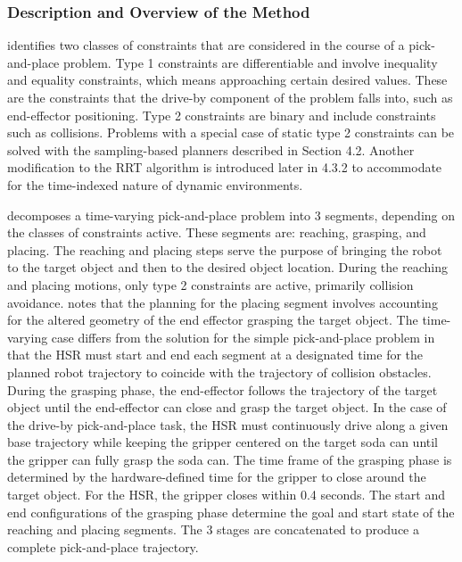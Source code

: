 \documentclass[11pt]{article}
\begin{document}
        \subsubsection{Description and Overview of the Method}
            \cite{yang_planning_2018} identifies two classes of constraints that are considered in the course of a pick-and-place problem. Type 1 constraints are differentiable and involve inequality and equality constraints, which means approaching certain desired values. These are the constraints that the drive-by component of the problem falls into, such as end-effector positioning. Type 2 constraints are binary and include constraints such as collisions. Problems with a special case of static type 2 constraints can be solved with the sampling-based planners described in Section 4.2. Another modification to the RRT algorithm is introduced later in 4.3.2 to accommodate for the time-indexed nature of dynamic environments.

            \par \cite{yang_planning_2018} decomposes a time-varying pick-and-place problem into 3 segments, depending on the classes of constraints active. These segments are: reaching, grasping, and placing. The reaching and placing steps serve the purpose of bringing the robot to the target object and then to the desired object location. During the reaching and placing motions, only type 2 constraints are active, primarily collision avoidance. \cite{yang_planning_2018} notes that the planning for the placing segment involves accounting for the altered geometry of the end effector grasping the target object. The time-varying case differs from the solution for the simple pick-and-place problem in that the HSR must start and end each segment at a designated time for the planned robot trajectory to coincide with the trajectory of collision obstacles. During the grasping phase, the end-effector follows the trajectory of the target object until the end-effector can close and grasp the target object. In the case of the drive-by pick-and-place task, the HSR must continuously drive along a given base trajectory while keeping the gripper centered on the target soda can until the gripper can fully grasp the soda can. The time frame of the grasping phase is determined by the hardware-defined time for the gripper to close around the target object. For the HSR, the gripper closes within 0.4 seconds. The start and end configurations of the grasping phase determine the goal and start state of the reaching and placing segments. The 3 stages are concatenated to produce a complete pick-and-place trajectory.
\end{document}
